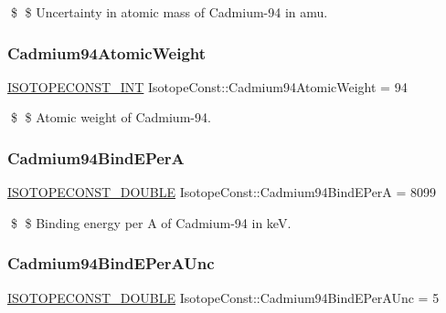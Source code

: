 \$ \$ Uncertainty in atomic mass of Cadmium-\/94 in amu. \mbox{\label{group___isotope_const-_cadmium-_cd94_ga12e3d4bb8cd491734ddcb7977f23982a}} 
\subsubsection{\texorpdfstring{Cadmium94\+Atomic\+Weight}{Cadmium94AtomicWeight}}
{\footnotesize\ttfamily \mbox{\hyperlink{group___isotope_const-_macros_ga5f18360b3e99483a35c32d789e62621c}{I\+S\+O\+T\+O\+P\+E\+C\+O\+N\+S\+T\+\_\+\+I\+NT}} Isotope\+Const\+::\+Cadmium94\+Atomic\+Weight = 94}

\$ \$ Atomic weight of Cadmium-\/94. \mbox{\label{group___isotope_const-_cadmium-_cd94_gaa4b23343f480d5318e4f3336a0ad7ef3}} 
\subsubsection{\texorpdfstring{Cadmium94\+Bind\+E\+PerA}{Cadmium94BindEPerA}}
{\footnotesize\ttfamily \mbox{\hyperlink{group___isotope_const-_macros_ga8f45a7272ce02c0b4c65c44636ed719a}{I\+S\+O\+T\+O\+P\+E\+C\+O\+N\+S\+T\+\_\+\+D\+O\+U\+B\+LE}} Isotope\+Const\+::\+Cadmium94\+Bind\+E\+PerA = 8099}

\$ \$ Binding energy per A of Cadmium-\/94 in keV. \mbox{\label{group___isotope_const-_cadmium-_cd94_ga953326bd12dbf5db79dffc0a4104da17}} 
\subsubsection{\texorpdfstring{Cadmium94\+Bind\+E\+Per\+A\+Unc}{Cadmium94BindEPerAUnc}}
{\footnotesize\ttfamily \mbox{\hyperlink{group___isotope_const-_macros_ga8f45a7272ce02c0b4c65c44636ed719a}{I\+S\+O\+T\+O\+P\+E\+C\+O\+N\+S\+T\+\_\+\+D\+O\+U\+B\+LE}} Isotope\+Const\+::\+Cadmium94\+Bind\+E\+Per\+A\+Unc = 5}

